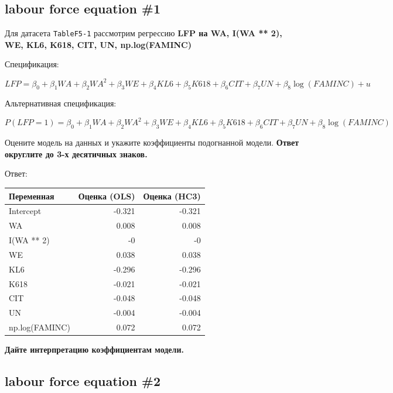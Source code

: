 \documentclass[
  russian,
]{article}
\newcounter{none} %
\begin{document}
\subsection{labour force equation \#1}\label{labour-force-equation-1}

Для датасета \texttt{TableF5-1} рассмотрим регрессию \textbf{LFP на WA,
I(WA ** 2), WE, KL6, K618, CIT, UN, np.log(FAMINC)}

Спецификация:

\begin{equation}
LFP=\beta_0+\beta_1WA+\beta_2WA^2+\beta_3WE+\beta_4KL6+\beta_5K618+\beta_6CIT+\beta_7UN+\beta_8\log(FAMINC)+u
\end{equation}

Альтернативная спецификация:

\begin{equation}
P(LFP=1)=\beta_0+\beta_1WA+\beta_2WA^2+\beta_3WE+\beta_4KL6+\beta_5K618+\beta_6CIT+\beta_7UN+\beta_8\log(FAMINC)
\end{equation}

Оцените модель на данных и укажите коэффициенты подогнанной модели.
\textbf{Ответ округлите до 3-х десятичных знаков.}

Ответ:

{\def\LTcaptype{none} %
\begin{longtable}[]{@{}lrr@{}}
\toprule\noalign{}
Переменная & Оценка (OLS) & Оценка (HC3) \\
\midrule\noalign{}
\endhead
\bottomrule\noalign{}
\endlastfoot
Intercept & -0.321 & -0.321 \\
WA & 0.008 & 0.008 \\
I(WA ** 2) & -0 & -0 \\
WE & 0.038 & 0.038 \\
KL6 & -0.296 & -0.296 \\
K618 & -0.021 & -0.021 \\
CIT & -0.048 & -0.048 \\
UN & -0.004 & -0.004 \\
np.log(FAMINC) & 0.072 & 0.072 \\
\end{longtable}
}

\textbf{Дайте интерпретацию коэффициентам модели.}

\subsection{labour force equation \#2}\label{labour-force-equation-2}
\end{document}
